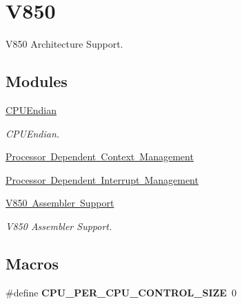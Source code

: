 \hypertarget{group__RTEMSScoreCPUV850}{}\section{V850}
\label{group__RTEMSScoreCPUV850}


V850 Architecture Support.  


\subsection*{Modules}
\begin{DoxyCompactItemize}
\item 
\mbox{\hyperlink{group__RTEMSScoreCPUV850CPUEndian}{C\+P\+U\+Endian}}
\begin{DoxyCompactList}\small\item\em C\+P\+U\+Endian. \end{DoxyCompactList}\item 
\mbox{\hyperlink{group__RTEMSScoreCPUV850CPUContext}{Processor Dependent Context Management}}
\item 
\mbox{\hyperlink{group__RTEMSScoreCPUV850CPUInterrupt}{Processor Dependent Interrupt Management}}
\item 
\mbox{\hyperlink{group__RTEMSScoreCPUV850ASM}{V850 Assembler Support}}
\begin{DoxyCompactList}\small\item\em V850 Assembler Support. \end{DoxyCompactList}\end{DoxyCompactItemize}
\subsection*{Macros}
\begin{DoxyCompactItemize}
\item 
\mbox{\label{group__RTEMSScoreCPUV850_gaf8e38596ad3db49995fd8eb9fb4e86b2}} 
\#define {\bfseries C\+P\+U\+\_\+\+P\+E\+R\+\_\+\+C\+P\+U\+\_\+\+C\+O\+N\+T\+R\+O\+L\+\_\+\+S\+I\+ZE}~0
\end{DoxyCompactItemize}
